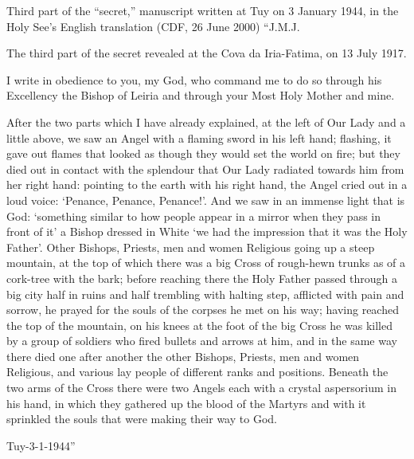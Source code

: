 \begin{operativetext}{Third part of the ``secret,'' manuscript written
at Tuy on 3 January 1944, in the Holy See's English translation (CDF,
26 June 2000)}
``J.M.J.
\par\medskip
The third part of the secret revealed at the Cova da Iria-Fatima, on
13 July 1917.
\par\medskip
I write in obedience to you, my God, who command me to do so through
his Excellency the Bishop of Leiria and through your Most Holy Mother
and mine.
\par\medskip
After the two parts which I have already explained, at the left of
Our Lady and a little above, we saw an Angel with a flaming sword in
his left hand; flashing, it gave out flames that looked as though
they would set the world on fire; but they died out in contact with
the splendour that Our Lady radiated towards him from her right hand:
pointing to the earth with his right hand, the Angel cried out in a
loud voice: `Penance, Penance, Penance!'. And we saw in an immense
light that is God: `something similar to how people appear in a
mirror when they pass in front of it' a Bishop dressed in White `we
had the impression that it was the Holy Father'. Other Bishops,
Priests, men and women Religious going up a steep mountain, at the
top of which there was a big Cross of rough-hewn trunks as of a
cork-tree with the bark; before reaching there the Holy Father passed
through a big city half in ruins and half trembling with halting
step, afflicted with pain and sorrow, he prayed for the souls of the
corpses he met on his way; having reached the top of the mountain, on
his knees at the foot of the big Cross he was killed by a group of
soldiers who fired bullets and arrows at him, and in the same way
there died one after another the other Bishops, Priests, men and
women Religious, and various lay people of different ranks and
positions. Beneath the two arms of the Cross there were two Angels
each with a crystal aspersorium in his hand, in which they gathered
up the blood of the Martyrs and with it sprinkled the souls that were
making their way to God.
\par\medskip
Tuy-3-1-1944''
\end{operativetext}

